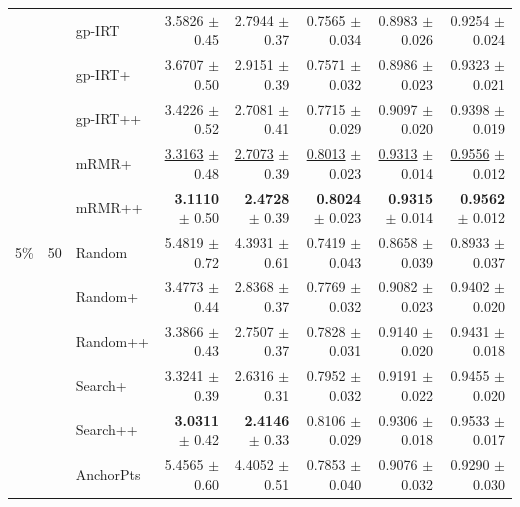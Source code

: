 \begin{longtable}{llp{}rrrrr}
 &  & gp-IRT & 3.5826 {\scriptsize $\pm$ 0.45} & 2.7944 {\scriptsize $\pm$ 0.37} & 0.7565 {\scriptsize $\pm$ 0.034} & 0.8983 {\scriptsize $\pm$ 0.026} & 0.9254 {\scriptsize $\pm$ 0.024} \\
 &  & gp-IRT+ & 3.6707 {\scriptsize $\pm$ 0.50} & 2.9151 {\scriptsize $\pm$ 0.39} & 0.7571 {\scriptsize $\pm$ 0.032} & 0.8986 {\scriptsize $\pm$ 0.023} & 0.9323 {\scriptsize $\pm$ 0.021} \\
 &  & gp-IRT++ & 3.4226 {\scriptsize $\pm$ 0.52} & 2.7081 {\scriptsize $\pm$ 0.41} & 0.7715 {\scriptsize $\pm$ 0.029} & 0.9097 {\scriptsize $\pm$ 0.020} & 0.9398 {\scriptsize $\pm$ 0.019} \\
 &  & mRMR+ & \underline{3.3163} {\scriptsize $\pm$ 0.48} & \underline{2.7073} {\scriptsize $\pm$ 0.39} & \underline{0.8013} {\scriptsize $\pm$ 0.023} & \underline{0.9313} {\scriptsize $\pm$ 0.014} & \underline{0.9556} {\scriptsize $\pm$ 0.012} \\
 &  & mRMR++ & \textbf{3.1110} {\scriptsize $\pm$ 0.50} & \textbf{2.4728} {\scriptsize $\pm$ 0.39} & \textbf{0.8024} {\scriptsize $\pm$ 0.023} & \textbf{0.9315} {\scriptsize $\pm$ 0.014} & \textbf{0.9562} {\scriptsize $\pm$ 0.012} \\
\midrule
5\% & 50 & Random & 5.4819 {\scriptsize $\pm$ 0.72} & 4.3931 {\scriptsize $\pm$ 0.61} & 0.7419 {\scriptsize $\pm$ 0.043} & 0.8658 {\scriptsize $\pm$ 0.039} & 0.8933 {\scriptsize $\pm$ 0.037} \\
 &  & Random+ & 3.4773 {\scriptsize $\pm$ 0.44} & 2.8368 {\scriptsize $\pm$ 0.37} & 0.7769 {\scriptsize $\pm$ 0.032} & 0.9082 {\scriptsize $\pm$ 0.023} & 0.9402 {\scriptsize $\pm$ 0.020} \\
 &  & Random++ & 3.3866 {\scriptsize $\pm$ 0.43} & 2.7507 {\scriptsize $\pm$ 0.37} & 0.7828 {\scriptsize $\pm$ 0.031} & 0.9140 {\scriptsize $\pm$ 0.020} & 0.9431 {\scriptsize $\pm$ 0.018} \\
 &  & Search+ & 3.3241 {\scriptsize $\pm$ 0.39} & 2.6316 {\scriptsize $\pm$ 0.31} & 0.7952 {\scriptsize $\pm$ 0.032} & 0.9191 {\scriptsize $\pm$ 0.022} & 0.9455 {\scriptsize $\pm$ 0.020} \\
 &  & Search++ & \textbf{3.0311} {\scriptsize $\pm$ 0.42} & \textbf{2.4146} {\scriptsize $\pm$ 0.33} & 0.8106 {\scriptsize $\pm$ 0.029} & 0.9306 {\scriptsize $\pm$ 0.018} & 0.9533 {\scriptsize $\pm$ 0.017} \\
 &  & AnchorPts & 5.4565 {\scriptsize $\pm$ 0.60} & 4.4052 {\scriptsize $\pm$ 0.51} & 0.7853 {\scriptsize $\pm$ 0.040} & 0.9076 {\scriptsize $\pm$ 0.032} & 0.9290 {\scriptsize $\pm$ 0.030} \\

\end{longtable}
